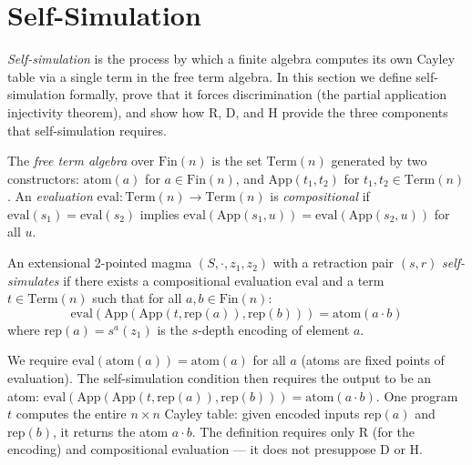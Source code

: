 \documentclass[sigconf,screen]{acmart}
\newcommand{\dotop}{\cdot}
\newcommand{\Fin}{\mathrm{Fin}}
\theoremstyle{remark}
\begin{document}
\section{Self-Simulation}
\label{sec:selfsim}

\emph{Self-simulation} is the process by which a finite algebra computes its own Cayley table via a single term in the free term algebra. In this section we define self-simulation formally, prove that it forces discrimination (the partial application injectivity theorem), and show how R, D, and H provide the three components that self-simulation requires.

\begin{definition}
The \emph{free term algebra} over $\Fin(n)$ is the set $\text{Term}(n)$ generated by two constructors: $\text{atom}(a)$ for $a \in \Fin(n)$, and $\text{App}(t_1, t_2)$ for $t_1, t_2 \in \text{Term}(n)$. An \emph{evaluation} $\text{eval} : \text{Term}(n) \to \text{Term}(n)$ is \emph{compositional} if $\text{eval}(s_1) = \text{eval}(s_2)$ implies $\text{eval}(\text{App}(s_1, u)) = \text{eval}(\text{App}(s_2, u))$ for all $u$.
\end{definition}

\begin{definition}
\label{def:selfsim}
An extensional 2-pointed magma $(S, \dotop, z_1, z_2)$ with a retraction pair $(s, r)$ \emph{self-simulates} if there exists a compositional evaluation $\text{eval}$ and a term $t \in \text{Term}(n)$ such that for all $a, b \in \Fin(n)$:
\[
\text{eval}(\text{App}(\text{App}(t, \text{rep}(a)), \text{rep}(b))) = \text{atom}(a \dotop b)
\]
where $\text{rep}(a) = s^{a}(z_1)$ is the $s$-depth encoding of element $a$.
\end{definition}

We require $\text{eval}(\text{atom}(a)) = \text{atom}(a)$ for all $a$ (atoms are fixed points of evaluation). The self-simulation condition then requires the output to be an atom: $\text{eval}(\text{App}(\text{App}(t, \text{rep}(a)), \text{rep}(b))) = \text{atom}(a \dotop b)$. One program $t$ computes the entire $n \times n$ Cayley table: given encoded inputs $\text{rep}(a)$ and $\text{rep}(b)$, it returns the atom $a \dotop b$. The definition requires only R (for the encoding) and compositional evaluation --- it does not presuppose D or H.
\end{document}
